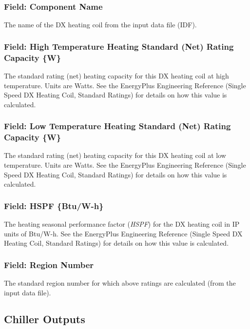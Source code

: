 \subsubsection{Field: Component Name}\label{field-component-name-5}

The name of the DX heating coil from the input data file (IDF).

\subsubsection{Field: High Temperature Heating Standard (Net) Rating Capacity \{W\}}\label{field-high-temperature-heating-standard-net-rating-capacity-w}

The standard rating (net) heating capacity for this DX heating coil at high temperature. Units are Watts. See the EnergyPlus Engineering Reference (Single Speed DX Heating Coil, Standard Ratings) for details on how this value is calculated.

\subsubsection{Field: Low Temperature Heating Standard (Net) Rating Capacity \{W\}}\label{field-low-temperature-heating-standard-net-rating-capacity-w}

The standard rating (net) heating capacity for this DX heating coil at low temperature. Units are Watts. See the EnergyPlus Engineering Reference (Single Speed DX Heating Coil, Standard Ratings) for details on how this value is calculated.

\subsubsection{Field: HSPF \{Btu/W-h\}}\label{field-hspf-btuw-h}

The heating seasonal performance factor (\emph{HSPF}) for the DX heating coil in IP units of Btu/W-h. See the EnergyPlus Engineering Reference (Single Speed DX Heating Coil, Standard Ratings) for details on how this value is calculated.

\subsubsection{Field: Region Number}\label{field-region-number}

The standard region number for which above ratings are calculated (from the input data file).

\subsection{Chiller Outputs}\label{chiller-outputs}

